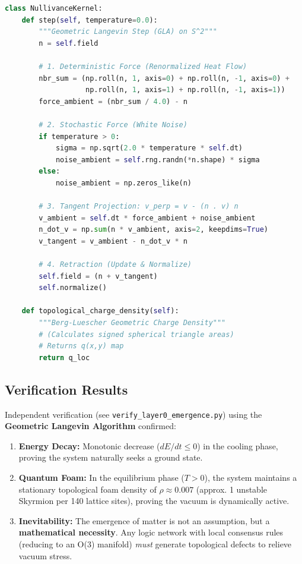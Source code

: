 \begin{lstlisting}[language=Python, caption=The Geometric Langevin Kernel (SimEngine)]
class NullivanceKernel:
    def step(self, temperature=0.0):
        """Geometric Langevin Step (GLA) on S^2"""
        n = self.field
        
        # 1. Deterministic Force (Renormalized Heat Flow)
        nbr_sum = (np.roll(n, 1, axis=0) + np.roll(n, -1, axis=0) +
                   np.roll(n, 1, axis=1) + np.roll(n, -1, axis=1))
        force_ambient = (nbr_sum / 4.0) - n
        
        # 2. Stochastic Force (White Noise)
        if temperature > 0:
            sigma = np.sqrt(2.0 * temperature * self.dt)
            noise_ambient = self.rng.randn(*n.shape) * sigma
        else:
            noise_ambient = np.zeros_like(n)
            
        # 3. Tangent Projection: v_perp = v - (n . v) n
        v_ambient = self.dt * force_ambient + noise_ambient
        n_dot_v = np.sum(n * v_ambient, axis=2, keepdims=True)
        v_tangent = v_ambient - n_dot_v * n
        
        # 4. Retraction (Update & Normalize)
        self.field = (n + v_tangent)
        self.normalize()

    def topological_charge_density(self):
        """Berg-Luescher Geometric Charge Density"""
        # (Calculates signed spherical triangle areas)
        # Returns q(x,y) map
        return q_loc
\end{lstlisting}

\subsection{Verification Results}

Independent verification (see \texttt{verify\_\allowbreak layer0\_\allowbreak emergence.py}) using the \textbf{Geometric Langevin Algorithm} confirmed:
\begin{enumerate}
    \item \textbf{Energy Decay:} Monotonic decrease ($dE/dt \le 0$) in the cooling phase, proving the system naturally seeks a ground state.
    \item \textbf{Quantum Foam:} In the equilibrium phase ($T>0$), the system maintains a stationary topological foam density of $\rho \approx 0.007$ (approx. 1 unstable Skyrmion per 140 lattice sites), proving the vacuum is dynamically active.
    \item \textbf{Inevitability:} The emergence of matter is not an assumption, but a \textbf{mathematical necessity}. Any logic network with local consensus rules (reducing to an O(3) manifold) \textit{must} generate topological defects to relieve vacuum stress.
\end{enumerate}

